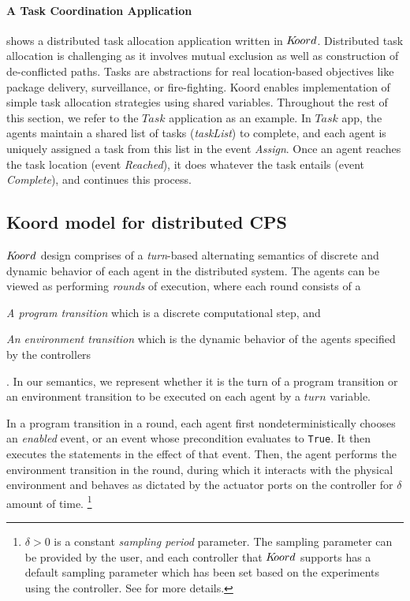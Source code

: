 \paragraph* {A  Task Coordination Application}  shows a distributed task allocation application written in $K\kern-2pt oord$. Distributed task allocation is challenging as it involves mutual exclusion as well as construction of de-conflicted  paths. Tasks are abstractions for real location-based objectives like package delivery, surveillance, or fire-fighting.  Koord enables implementation of simple task allocation strategies using shared variables. Throughout the rest of this section, we refer to the $\mathit{Task}$ application as an example.
In $\mathit{Task}$ app, the agents maintain a shared list of tasks ({\em taskList}) to complete, and each agent is uniquely assigned a task from this list in the event {\em Assign}. Once an agent reaches the task location (event {\em Reached}), it does whatever the task entails (event {\em Complete}), and continues this process.

\subsection{Koord model for distributed CPS}
$K\kern-2pt oord$ design comprises of a \emph{turn}-based alternating semantics of discrete and dynamic behavior of each agent in the distributed system. The agents can be viewed as performing \emph{rounds} of execution, where each round consists of a \begin{inparaenum} \item \emph{A program transition} which is a discrete computational step, and \item \emph{An environment transition} which is the dynamic behavior of the agents specified by the controllers \end{inparaenum}. In our semantics, we represent whether it is the turn of a program transition or an environment transition to be executed on each agent by a $\mathit{turn}$ variable.  

In a program transition in a round, each agent first nondeterministically chooses an \emph{enabled} event, or an event whose precondition evaluates to \verb|True|. It then executes the statements in the effect of that event. %
Then, the agent performs the environment transition in the round, during which it interacts with the physical environment and behaves as dictated by the actuator ports on the controller for $\delta$ amount of time.  \footnote{ $\delta>0$ is a constant \emph{sampling period} parameter. The sampling parameter can be provided by the user, and each controller that $K\kern-2pt oord$ supports has a default sampling parameter which has been set based on the experiments using the controller. See  for more details.}  %

